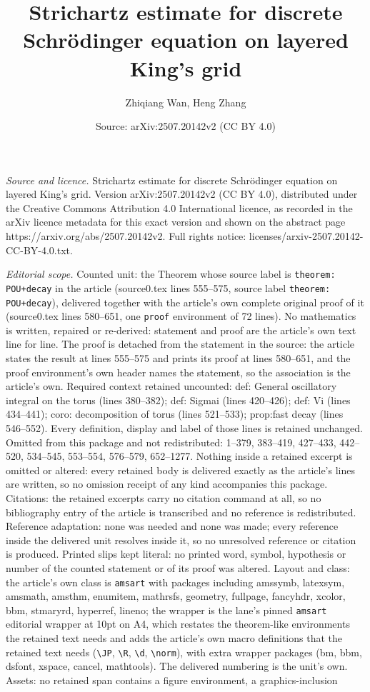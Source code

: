 \documentclass[10pt,a4paper]{amsart}
\title[Strichartz estimate for discrete Schr\"odinger equation on l]{Strichartz estimate for discrete Schr\"odinger equation on layered King's grid}
\author{Zhiqiang Wan, Heng Zhang}
\date{Source: arXiv:2507.20142v2 (CC BY 4.0)}
\begin{document}
\maketitle

\noindent\emph{Source and licence.} Strichartz estimate for discrete Schr\"odinger equation on layered King's grid. Version arXiv:2507.20142v2 (CC BY 4.0), distributed under the Creative Commons Attribution 4.0 International licence, as recorded in the arXiv licence metadata for this exact version and shown on the abstract page https://arxiv.org/abs/2507.20142v2. Full rights notice: licenses/arxiv-2507.20142-CC-BY-4.0.txt.\par\smallskip

\noindent\textit{Editorial scope.} Counted unit: the Theorem whose source label is \texttt{theorem: POU+decay} in the article (source0.tex lines 555--575, source label \texttt{theorem: POU+decay}), delivered together with the article's own complete original proof of it (source0.tex lines 580--651, one \texttt{proof} environment of 72 lines). No mathematics is written, repaired or re-derived: statement and proof are the article's own text line for line. The proof is detached from the statement in the source: the article states the result at lines 555--575 and prints its proof at lines 580--651, and the proof environment's own header names the statement, so the association is the article's own. Required context retained uncounted: def: General oscillatory integral on the torus (lines 380--382); def: Sigmai (lines 420--426); def: Vi (lines 434--441); coro: decomposition of torus (lines 521--533); prop:fast decay (lines 546--552). Every definition, display and label of those lines is retained unchanged. Omitted from this package and not redistributed: 1--379, 383--419, 427--433, 442--520, 534--545, 553--554, 576--579, 652--1277. Nothing inside a retained excerpt is omitted or altered: every retained body is delivered exactly as the article's lines are written, so no omission receipt of any kind accompanies this package. Citations: the retained excerpts carry no citation command at all, so no bibliography entry of the article is transcribed and no reference is redistributed. Reference adaptation: none was needed and none was made; every reference inside the delivered unit resolves inside it, so no unresolved reference or citation is produced. Printed slips kept literal: no printed word, symbol, hypothesis or number of the counted statement or of its proof was altered. Layout and class: the article's own class is \texttt{amsart} with packages including amssymb, latexsym, amsmath, amsthm, enumitem, mathrsfs, geometry, fullpage, fancyhdr, xcolor, bbm, stmaryrd, hyperref, lineno; the wrapper is the lane's pinned \texttt{amsart} editorial wrapper at 10pt on A4, which restates the theorem-like environments the retained text needs and adds the article's own macro definitions that the retained text needs (\texttt{\textbackslash JP}, \texttt{\textbackslash R}, \texttt{\textbackslash d}, \texttt{\textbackslash norm}), with extra wrapper packages (bm, bbm, dsfont, xspace, cancel, mathtools). The delivered numbering is the unit's own. Assets: no retained span contains a figure environment, a graphics-inclusion 
\end{document}
